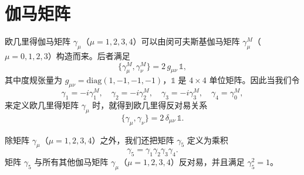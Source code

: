 \section{伽马矩阵}

欧几里得伽马矩阵 $\gamma_\mu$（$\mu = 1, 2, 3, 4$）可以由闵可夫斯基伽马矩阵 $\gamma_\mu^M$（$\mu = 0, 1, 2, 3$）构造而来。后者满足
\begin{equation}
  \{\gamma_\mu^M, \gamma_\nu^M\} = 2\,g_{\mu\nu}\,\mathbb{1},
\end{equation}
其中度规张量为 $g_{\mu\nu} = \mathrm{diag}(1,-1,-1,-1)$，$\mathbb{1}$ 是 $4\times 4$ 单位矩阵。因此当我们令
\begin{equation}
  \gamma_1 = -i\gamma_1^M,\quad
  \gamma_2 = -i\gamma_2^M,\quad
  \gamma_3 = -i\gamma_3^M,\quad
  \gamma_4 = \gamma_0^M,
\end{equation}
来定义欧几里得矩阵 $\gamma_\mu$ 时，就得到欧几里得反对易关系
\begin{equation}
  \{\gamma_\mu, \gamma_\nu\} = 2\,\delta_{\mu\nu}\,\mathbb{1}.
\end{equation}

除矩阵 $\gamma_\mu$（$\mu = 1, 2, 3, 4$）之外，我们还把矩阵 $\gamma_5$ 定义为乘积
\begin{equation}
  \gamma_5 = \gamma_1\gamma_2\gamma_3\gamma_4 .
\end{equation}
矩阵 $\gamma_5$ 与所有其他伽马矩阵 $\gamma_\mu$（$\mu = 1, 2, 3, 4$）反对易，并且满足 $\gamma_5^2 = 1$。

